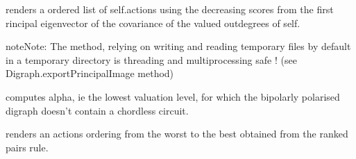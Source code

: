 \documentclass[letterpaper,10pt,english]{sphinxmanual}
\begin{document}
\begin{fulllineitems}
\begin{fulllineitems}
\end{fulllineitems}


\begin{fulllineitems}
\label{techDoc:digraphs.Digraph.computePrincipalOrder}
renders a ordered list of self.actions using the decreasing scores from the
first rincipal eigenvector of the covariance of the valued outdegrees of self.

\begin{notice}{note}{Note:}
The method, relying on writing and reading temporary files by default in a temporary directory is threading and multiprocessing safe !
(see Digraph.exportPrincipalImage method)
\end{notice}

\end{fulllineitems}


\begin{fulllineitems}
\label{techDoc:digraphs.Digraph.computePrudentBetaLevel}
computes alpha, ie the lowest valuation level, for which the
bipolarly polarised digraph doesn't contain a chordless circuit.

\end{fulllineitems}


\begin{fulllineitems}
\label{techDoc:digraphs.Digraph.computeRankedPairsOrder}
renders an actions ordering from the worst to the best obtained from the
ranked pairs rule.

\end{fulllineitems}


\begin{fulllineitems}
\label{techDoc:digraphs.Digraph.computeRankedPairsRanking}
\end{fulllineitems}


\end{fulllineitems}
\end{document}

